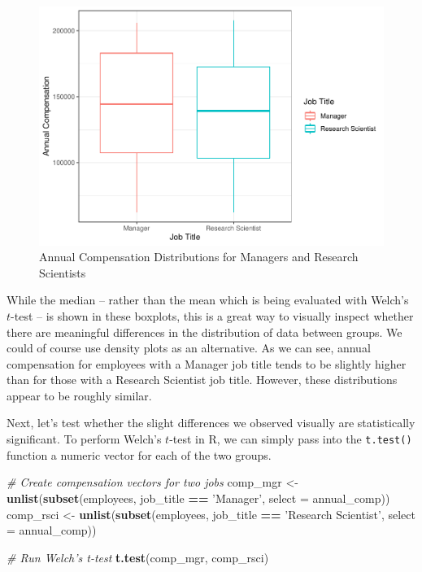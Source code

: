 \documentclass[]{book}
\newenvironment{Shaded}{\begin{snugshade}}{\end{snugshade}}
\newcommand{\CommentTok}[1]{\textcolor[rgb]{0.56,0.35,0.01}{\textit{#1}}}
\newcommand{\DataTypeTok}[1]{\textcolor[rgb]{0.13,0.29,0.53}{#1}}
\newcommand{\KeywordTok}[1]{\textcolor[rgb]{0.13,0.29,0.53}{\textbf{#1}}}
\newcommand{\NormalTok}[1]{#1}
\newcommand{\OperatorTok}[1]{\textcolor[rgb]{0.81,0.36,0.00}{\textbf{#1}}}
\newcommand{\StringTok}[1]{\textcolor[rgb]{0.31,0.60,0.02}{#1}}
\begin{document}
\begin{figure}

{\centering \includegraphics[width=1\linewidth]{People_Analytics_Lifecycle_files/figure-latex/comp-job-boxplots-1} 

}

\caption{Annual Compensation Distributions for Managers and Research Scientists}\label{fig:comp-job-boxplots}
\end{figure}

While the median -- rather than the mean which is being evaluated with Welch's \(t\)-test -- is shown in these boxplots, this is a great way to visually inspect whether there are meaningful differences in the distribution of data between groups. We could of course use density plots as an alternative. As we can see, annual compensation for employees with a Manager job title tends to be slightly higher than for those with a Research Scientist job title. However, these distributions appear to be roughly similar.

Next, let's test whether the slight differences we observed visually are statistically significant. To perform Welch's \(t\)-test in R, we can simply pass into the \texttt{t.test()} function a numeric vector for each of the two groups.

\begin{Shaded}
\begin{Highlighting}[]
\CommentTok{# Create compensation vectors for two jobs}
\NormalTok{comp_mgr <-}\StringTok{ }\KeywordTok{unlist}\NormalTok{(}\KeywordTok{subset}\NormalTok{(employees, job_title }\OperatorTok{==}\StringTok{ 'Manager'}\NormalTok{, }\DataTypeTok{select =}\NormalTok{ annual_comp))}
\NormalTok{comp_rsci <-}\StringTok{ }\KeywordTok{unlist}\NormalTok{(}\KeywordTok{subset}\NormalTok{(employees, job_title }\OperatorTok{==}\StringTok{ 'Research Scientist'}\NormalTok{, }\DataTypeTok{select =}\NormalTok{ annual_comp))}

\CommentTok{# Run Welch's t-test}
\KeywordTok{t.test}\NormalTok{(comp_mgr, comp_rsci)}
\end{Highlighting}
\end{Shaded}
\end{document}
